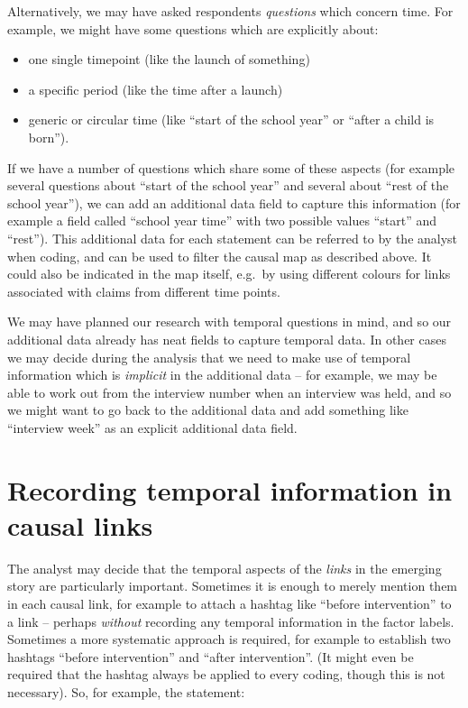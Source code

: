\documentclass[
]{book}
\begin{document}
Alternatively, we may have asked respondents \emph{questions} which concern time. For example, we might have some questions which are explicitly about:

\begin{itemize}
\item
  one single timepoint (like the launch of something)
\item
  a specific period (like the time after a launch)
\item
  generic or circular time (like ``start of the school year'' or ``after a child is born'').
\end{itemize}

If we have a number of questions which share some of these aspects (for example several questions about ``start of the school year'' and several about ``rest of the school year''), we can add an additional data field to capture this information (for example a field called ``school year time'' with two possible values ``start'' and ``rest''). This additional data for each statement can be referred to by the analyst when coding, and can be used to filter the causal map as described above. It could also be indicated in the map itself, e.g.~by using different colours for links associated with claims from different time points.

We may have planned our research with temporal questions in mind, and so our additional data already has neat fields to capture temporal data. In other cases we may decide during the analysis that we need to make use of temporal information which is \emph{implicit} in the additional data -- for example, we may be able to work out from the interview number when an interview was held, and so we might want to go back to the additional data and add something like ``interview week'' as an explicit additional data field.

\hypertarget{recording-temporal-information-in-causal-links}{%
\section{Recording temporal information in causal links}\label{recording-temporal-information-in-causal-links}}

The analyst may decide that the temporal aspects of the \emph{links} in the emerging story are particularly important. Sometimes it is enough to merely mention them in each causal link, for example to attach a hashtag like ``before intervention'' to a link -- perhaps \emph{without} recording any temporal information in the factor labels. Sometimes a more systematic approach is required, for example to establish two hashtags ``before intervention'' and ``after intervention''. (It might even be required that the hashtag always be applied to every coding, though this is not necessary). So, for example, the statement:
\end{document}
